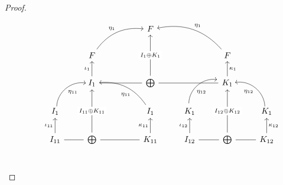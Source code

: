 \begin{proof}
\begin{subproof}
\[
\begin{tikzcd}
                                                   &                                                           &                                                         &                                                             & F                                                          &                                                           &                                                          &                                                          \\
                                                   &                                                           & F \arrow[rru, "\eta_{1}", bend left]                    &                                                             &                                                            &                                                           & F \arrow[llu, "\eta_{1}"', bend right]                   &                                                          \\
                                                   &                                                           & I_{1} \arrow[u, "\iota_{1}"] \arrow[rr, dash]         &                                                             & \bigoplus \arrow[uu, "I_{1} \oplus K_{1}" description]     &                                                           & K_{1} \arrow[u, "\kappa_{1}"'] \arrow[ll, dash]        &                                                          \\
                                                   & I_{1} \arrow[ru, "\eta_{11}"', bend left=49, shift right] &                                                         &                                                             & I_{1} \arrow[llu, "\eta_{11}", pos=0.35, bend right]                 & K_{1} \arrow[ru, "\eta_{12}"', pos=0.40, bend left=49, shift left] &                                                          & K_{1} \arrow[lu, "\eta_{12}", bend right=49, shift left] \\
                                                   & I_{11} \arrow[u, "\iota_{11}"] \arrow[r, dash]          & \bigoplus \arrow[uu, "I_{11}\oplus K_{11}" description] &                                                             & K_{11} \arrow[ll, dash] \arrow[u, "\kappa_{11}"]         & I_{12} \arrow[u, "\iota_{12}"] \arrow[r, dash]          & \bigoplus \arrow[uu, "I_{12} \oplus K_{12}" description] & K_{12} \arrow[u, "\kappa_{12}"'] \arrow[l, dash]       \\

\end{tikzcd}\]
\end{subproof}
\end{proof}

